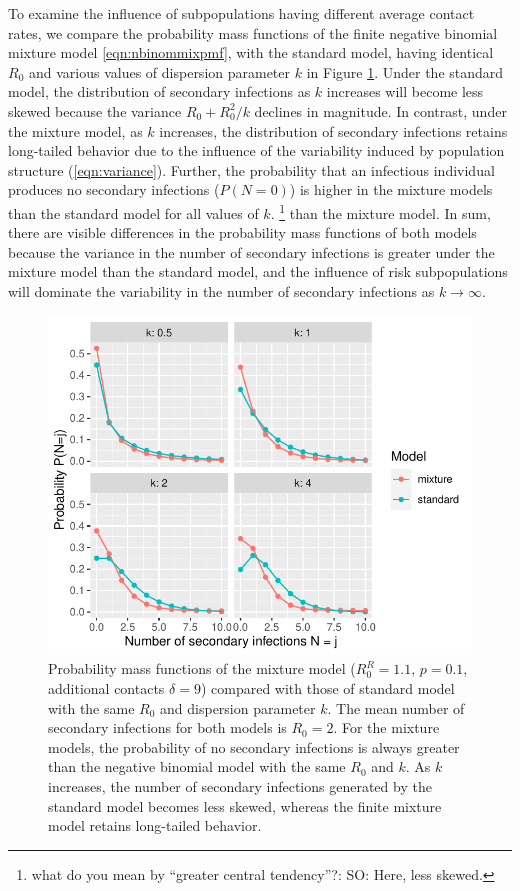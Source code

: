\documentclass{imammb}
\numberwithin{equation}{section}
\begin{document}
To examine the influence of subpopulations having different average contact rates, we compare the probability mass functions of the finite negative binomial mixture model \eqref{eqn:nbinommixpmf}, with the standard model, having identical $R_0$ and various values of dispersion parameter $k$ in Figure \ref{fig:pmf}. Under the standard model, the distribution of secondary infections as $k$ increases will become less skewed because the variance $R_0 + R_0^2/k$ declines in magnitude. In contrast, under the mixture model, as $k$ increases, the distribution of secondary infections retains long-tailed behavior due to the influence of the variability induced by population structure (\eqref{eqn:variance}). 
Further, the probability that an infectious individual produces no secondary infections ($P(N=0)$) is higher in the mixture models than the standard model for all values of $k$.  \footnote{what do you mean by ``greater central tendency''?: SO: Here, less skewed. } than the mixture model. In sum, there are visible differences in the probability mass functions of both models  because the variance in the number of secondary infections is greater under the mixture model than the standard model,  and the influence of risk subpopulations will dominate the variability in the number of secondary infections as $k \rightarrow \infty$. 

\begin{figure}%
\centering\includegraphics {Figure1.pdf}
\caption{Probability mass functions of the mixture model ($R_0^R=1.1$, $p=0.1$, additional contacts $\delta =9$) compared with those of standard model with the same $R_0$ and dispersion parameter $k$. The mean number of secondary infections for both models is $R_0 =2$. For the mixture models, the probability of no secondary infections is always greater than the negative binomial model with the same $R_0$ and $k$. As $k$ increases, the number of secondary infections generated by the standard model becomes less skewed, whereas the finite mixture model retains long-tailed behavior. }
\label{fig:pmf}\vspace*{-9pt}
\end{figure}
\end{document}
